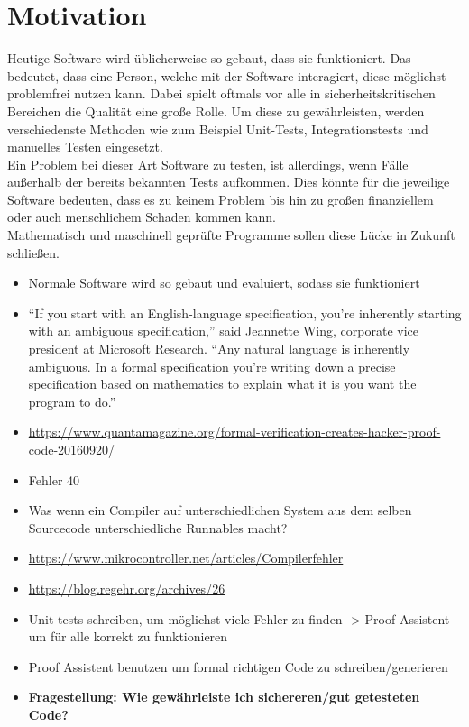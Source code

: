 \section{Motivation}
Heutige Software wird üblicherweise so gebaut, dass sie funktioniert. Das bedeutet, dass eine Person, welche mit der Software interagiert, diese möglichst problemfrei nutzen kann. Dabei spielt oftmals vor alle in sicherheitskritischen Bereichen die Qualität eine große Rolle.
Um diese zu gewährleisten, werden verschiedenste Methoden wie zum Beispiel Unit-Tests, Integrationstests und manuelles Testen eingesetzt.\\
Ein Problem bei dieser Art Software zu testen, ist allerdings, wenn Fälle außerhalb der bereits bekannten Tests aufkommen. Dies könnte für die jeweilige Software bedeuten, dass es zu keinem Problem bis hin zu großen finanziellem oder auch menschlichem Schaden kommen kann.\\
Mathematisch und maschinell geprüfte Programme sollen diese Lücke in Zukunft schließen. 


\begin{itemize}
	\item Normale Software wird so gebaut und evaluiert, sodass sie funktioniert
	\item “If you start with an English-language specification, you’re inherently starting with an ambiguous specification,” said Jeannette Wing, corporate vice president at Microsoft Research. “Any natural language is inherently ambiguous. In a formal specification you’re writing down a precise specification based on mathematics to explain what it is you want the program to do.”
	\item \url{https://www.quantamagazine.org/formal-verification-creates-hacker-proof-code-20160920/}
	\item Fehler 40
	\item Was wenn ein Compiler auf unterschiedlichen System aus dem selben Sourcecode unterschiedliche Runnables macht?
	\item \url{https://www.mikrocontroller.net/articles/Compilerfehler}
	\item \url{https://blog.regehr.org/archives/26}
	\item Unit tests schreiben, um möglichst viele Fehler zu finden -> Proof Assistent um für alle korrekt zu funktionieren
	\item Proof Assistent benutzen um formal richtigen Code zu schreiben/generieren
	\item \textbf{Fragestellung: Wie gewährleiste ich sichereren/gut getesteten Code?}
\end{itemize}



